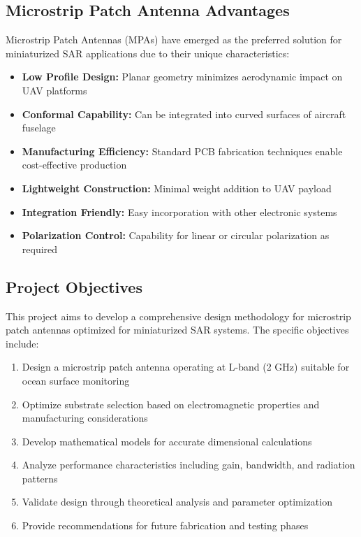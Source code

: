 \documentclass[12pt]{article}
\begin{document}
\subsection{Microstrip Patch Antenna Advantages}

Microstrip Patch Antennas (MPAs) have emerged as the preferred solution for miniaturized SAR applications due to their unique characteristics:

\begin{itemize}
    \item \textbf{Low Profile Design:} Planar geometry minimizes aerodynamic impact on UAV platforms
    \item \textbf{Conformal Capability:} Can be integrated into curved surfaces of aircraft fuselage
    \item \textbf{Manufacturing Efficiency:} Standard PCB fabrication techniques enable cost-effective production
    \item \textbf{Lightweight Construction:} Minimal weight addition to UAV payload
    \item \textbf{Integration Friendly:} Easy incorporation with other electronic systems
    \item \textbf{Polarization Control:} Capability for linear or circular polarization as required
\end{itemize}

\subsection{Project Objectives}

This project aims to develop a comprehensive design methodology for microstrip patch antennas optimized for miniaturized SAR systems. The specific objectives include:

\begin{enumerate}
    \item Design a microstrip patch antenna operating at L-band (2 GHz) suitable for ocean surface monitoring
    \item Optimize substrate selection based on electromagnetic properties and manufacturing considerations
    \item Develop mathematical models for accurate dimensional calculations
    \item Analyze performance characteristics including gain, bandwidth, and radiation patterns
    \item Validate design through theoretical analysis and parameter optimization
    \item Provide recommendations for future fabrication and testing phases
\end{enumerate}
\end{document}

